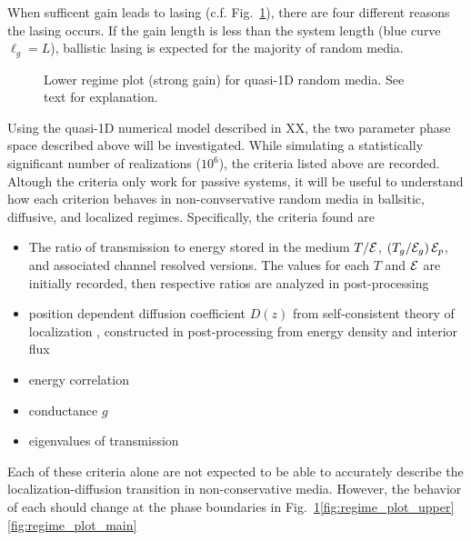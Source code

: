 When sufficent gain leads to lasing (c.f. Fig.~\ref{fig:regime_plot_lower}), there are four different reasons the lasing occurs. If the gain length is less than the system length (blue curve $\ell_g =L$), ballistic lasing is expected for the majority of random media. 

\begin{figure}
\vskip -0.5cm
\centerline{
}
\vskip -0.5cm
\caption{Lower regime plot (strong gain) for quasi-1D random media. See text for explanation.}
\label{fig:regime_plot_lower}
\end{figure}

Using the quasi-1D numerical model described in XX, the two parameter phase space described above will be investigated. While simulating a statistically significant number of realizations ($10^6$), the criteria listed above are recorded. Altough the criteria only work for passive systems, it will be useful to understand how each criterion behaves in non-convservative random media in ballsitic, diffusive, and localized regimes. Specifically, the criteria found are
\begin{itemize}
\item The ratio of transmission to energy stored in the medium $T/{\cal E}$, $\left(T_g/{\cal E}_g\right){\cal E}_p$, and associated channel resolved versions. The values for each $T$ and ${\cal E}$ are initially recorded, then respective ratios are analyzed in post-processing
\item position dependent diffusion coefficient $D(z)$ from self-consistent theory of localization \cite{2008_Cherroret}, constructed in post-processing from energy density and interior flux
\item energy correlation 
\item conductance $g$
\item eigenvalues of transmission
\end{itemize}
Each of these criteria alone are not expected to be able to accurately describe the localization-diffusion transition in non-conservative media. However, the behavior of each should change at the phase boundaries in Fig.~\ref{fig:regime_plot_lower}\ref{fig:regime_plot_upper}\ref{fig:regime_plot_main}


